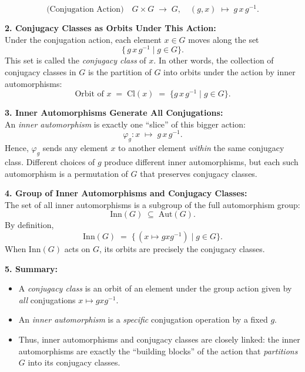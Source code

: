 \documentclass[12pt]{article}
\theoremstyle{definition} %
\theoremstyle{plain} %
\begin{document}
\[
\text{(Conjugation Action)} \quad G \times G \;\to\; G,\quad (g,x) \;\mapsto\; g\,x\,g^{-1}.
\]

\bigskip

\noindent
\textbf{2. Conjugacy Classes as Orbits Under This Action:}\\
Under the conjugation action, each element \(x \in G\) moves along the set
\[
\{\,g\,x\,g^{-1} \mid g \in G\}.
\]
This set is called the \emph{conjugacy class} of \(x\). In other words, the collection of conjugacy classes in \(G\) is the partition of \(G\) into orbits under the action by inner automorphisms:
\[
\text{Orbit of } x \;=\; \text{Cl}(x) \;=\; \{g\,x\,g^{-1} \mid g \in G\}.
\]

\bigskip

\noindent
\textbf{3. Inner Automorphisms Generate All Conjugations:}\\
An \emph{inner automorphism} is exactly one “slice” of this bigger action:
\[
\varphi_g: x \;\mapsto\; g\,x\,g^{-1}.
\]
Hence, \(\varphi_g\) sends any element \(x\) to another element \emph{within} the same conjugacy class.  Different choices of \(g\) produce different inner automorphisms, but each such automorphism is a permutation of \(G\) that preserves conjugacy classes.

\bigskip

\noindent
\textbf{4. Group of Inner Automorphisms and Conjugacy Classes:}\\
The set of all inner automorphisms is a subgroup of the full automorphism group:
\[
\mathrm{Inn}(G) \;\subseteq\; \mathrm{Aut}(G).
\]
By definition,
\[
\mathrm{Inn}(G) \;=\; \bigl\{\,(x \mapsto g x g^{-1}) \;\big|\; g \in G \bigr\}.
\]
When $\mathrm{Inn}(G)$ acts on $G$, its orbits are precisely the conjugacy classes.

\bigskip

\noindent
\textbf{5. Summary:}\\
\begin{itemize}
    \item A \emph{conjugacy class} is an orbit of an element under the group action given by \emph{all} conjugations $x \mapsto g x g^{-1}$.
    \item An \emph{inner automorphism} is a \emph{specific} conjugation operation by a fixed $g$.
    \item Thus, inner automorphisms and conjugacy classes are closely linked: the inner automorphisms are exactly the “building blocks” of the action that \emph{partitions} $G$ into its conjugacy classes.
\end{itemize}
\end{document}
